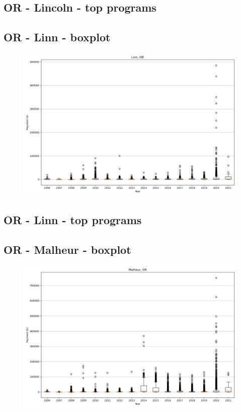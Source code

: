 \subsection*{OR - Lincoln - top programs}

\newpage
\subsection*{OR - Linn - boxplot}
\begin{figure}[h]
\centering
\includegraphics[width=7in]{../output/boxplots/counties/Linn-OR_boxplot.png}
\end{figure}


\subsection*{OR - Linn - top programs}

\newpage
\subsection*{OR - Malheur - boxplot}
\begin{figure}[h]
\centering
\includegraphics[width=7in]{../output/boxplots/counties/Malheur-OR_boxplot.png}
\end{figure}


